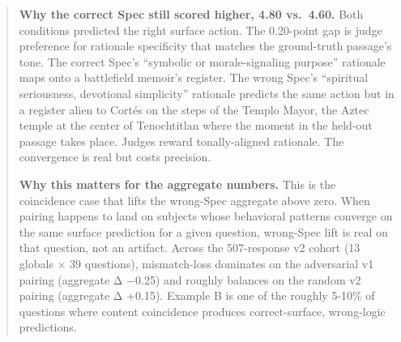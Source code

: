 \begin{quote}
\textbf{Why the correct Spec still scored higher, 4.80 vs.~4.60.} Both
conditions predicted the right surface action. The 0.20-point gap is
judge preference for rationale specificity that matches the ground-truth
passage's tone. The correct Spec's ``symbolic or morale-signaling
purpose'' rationale maps onto a battlefield memoir's register. The wrong
Spec's ``spiritual seriousness, devotional simplicity'' rationale
predicts the same action but in a register alien to Cortés on the steps
of the Templo Mayor, the Aztec temple at the center of Tenochtitlan
where the moment in the held-out passage takes place. Judges reward
tonally-aligned rationale. The convergence is real but costs precision.

\textbf{Why this matters for the aggregate numbers.} This is the
coincidence case that lifts the wrong-Spec aggregate above zero. When
pairing happens to land on subjects whose behavioral patterns converge
on the same surface prediction for a given question, wrong-Spec lift is
real on that question, not an artifact. Across the 507-response v2
cohort (13 globals × 39 questions), mismatch-loss dominates on the
adversarial v1 pairing (aggregate Δ −0.25) and roughly balances on the
random v2 pairing (aggregate Δ +0.15). Example B is one of the roughly
5-10\% of questions where content coincidence produces correct-surface,
wrong-logic predictions.
\end{quote}

